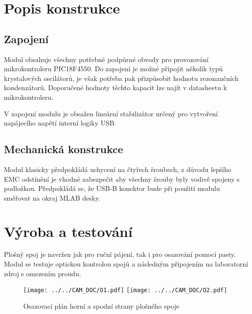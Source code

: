 \documentclass[12pt,a4paper,oneside]{article}
\begin{document}
\section{Popis konstrukce}

\subsection{Zapojení}
Modul obsahuje všechny potřebné podpůrné obvody pro provozování mikrokontroleru PIC18F4550. Do zapojení je možné připojit několik typů krystalových oscilátorů, je však potřeba pak přizpůsobit hodnotu rezonančních kondenzátorů. Doporučené hodnoty těchto kapacit lze najít v datasheetu k mikrokontroleru.  



V zapojení modulu je obsažen lineární stabilizátor určený pro vytvoření napájecího napětí interní logiky USB.

\subsection{Mechanická konstrukce}

Modul klasicky předpokládá uchycení na čtyřech šroubech, z důvodu lepšího EMC odstínění je vhodné zabezpečit aby všechny šrouby byly vodivě spojeny s podložkou.  Předpokládá se, že USB-B konektor bude při použití modulu směřovat na okraj MLAB desky. 

\section{Výroba a testování}

Plošný spoj je navržen jak pro ruční pájení, tak i pro osazování pomocí pasty.  Modul se testuje optickou kontrolou spojů a následným připojením na laboratorní zdroj s omezením proudu.

\newpage

\begin{figure} [h!tbp]
  \centering
  \texttt{[image: ../../CAM\_DOC/O1.pdf]}
  \texttt{[image: ../../CAM\_DOC/O2.pdf]}
  \caption{Osazovací plán horní a spodní strany plošného spoje}
  \label{fig:osazovaci_plan}
\end{figure}
\end{document}
